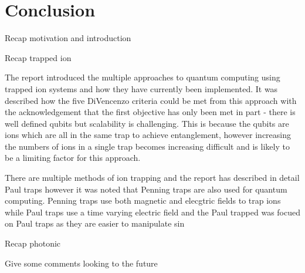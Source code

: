 \section{Conclusion}

Recap motivation and introduction

Recap trapped ion

The report introduced the multiple approaches to quantum computing using trapped ion systems and how they have currently been implemented. 
It was described how the five DiVencenzo criteria could be met from this approach with the acknowledgement that the first objective has only been met in part - there is well defined qubits but scalability is challenging.
This is because the qubits are ions which are all in the same trap to achieve entanglement, however increasing the numbers of ions in a single trap becomes increasing difficult and is likely to be a limiting factor for this approach. 

There are multiple methods of ion trapping and the report has described in detail Paul traps however it was noted that Penning traps are also used for quantum computing.
Penning traps use both magnetic and elecgtric fields to trap ions while Paul traps use a time varying electric field and the Paul trapped was focued on Paul traps as they are easier to manipulate sin

Recap photonic

Give some comments looking to the future